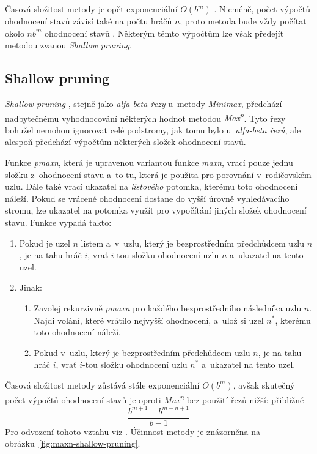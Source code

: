 Časová složitost metody je opět exponenciální $O(b^m)$ \cite{Search_policies_in_multiplayer_games_Nijssen_Winands}. Nicméně, počet výpočtů ohodnocení stavů závisí také na počtu hráčů $n$, proto metoda bude vždy počítat okolo $nb^m$ ohodnocení stavů \cite{Maxn}. Některým těmto výpočtům lze však předejít metodou zvanou \emph{Shallow pruning}.

\subsection*{Shallow pruning}

\emph{Shallow pruning} \cite{Maxn}, stejně jako \emph{alfa-beta řezy} u~metody \emph{Minimax}, předchází nadbytečnému vyhodnocování některých hodnot metodou \emph{Max\textsuperscript{n}}. Tyto řezy bohužel nemohou ignorovat celé podstromy, jak tomu bylo u~\emph{alfa-beta řezů}, ale alespoň předchází výpočtům některých složek ohodnocení stavů.

Funkce \emph{pmaxn}, která je upravenou variantou funkce \emph{maxn}, vrací pouze jednu složku z~ohodnocení stavu a~to tu, která je použita pro porovnání v~rodičovském uzlu. Dále také vrací ukazatel na \emph{listového} potomka, kterému toto ohodnocení náleží. Pokud se vrácené ohodnocení dostane do vyšší úrovně vyhledávacího stromu, lze ukazatel na potomka využít pro vypočítání jiných složek ohodnocení stavu. Funkce vypadá takto:
\begin{enumerate}
    \item Pokud je uzel $n$ listem a~v~uzlu, který je bezprostředním předchůdcem uzlu $n$, je na tahu hráč $i$, vrať $i$-tou složku ohodnocení uzlu $n$ a~ukazatel na tento uzel.
    \item Jinak:
    \begin{enumerate}
        \item Zavolej rekurzivně \emph{pmaxn} pro každého bezprostředního následníka uzlu $n$. Najdi volání, které vrátilo nejvyšší ohodnocení, a~ulož si uzel $n^*$, kterému toto ohodnocení náleží.
        \item Pokud v~uzlu, který je bezprostředním předchůdcem uzlu $n$, je na tahu hráč $i$, vrať $i$-tou složku ohodnocení uzlu $n^*$ a~ukazatel na tento uzel.
    \end{enumerate}
\end{enumerate}

Časová složitost metody zůstává stále exponenciální $O(b^m)$, avšak skutečný počet výpočtů ohodnocení stavů je oproti \emph{Max\textsuperscript{n}} bez použití řezů nižší: přibližně
\begin{equation}
    \frac{b^{m+1} - b^{m-n+1}}{b-1}
\end{equation}
Pro odvození tohoto vztahu viz \cite{Maxn}. Účinnost metody je znázorněna na obrázku~\ref{fig:maxn-shallow-pruning}.

